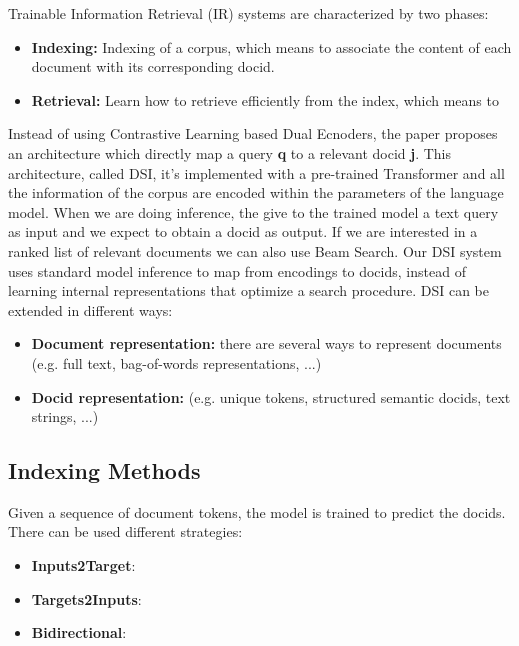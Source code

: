 Trainable Information Retrieval (IR) systems are characterized by two phases:
\begin{itemize}
  \item \textbf{Indexing: }Indexing of a corpus, which means to associate the content of each document with its corresponding docid.
  \item \textbf{Retrieval: }Learn how to retrieve efficiently from the index, which means to 
\end{itemize}
Instead of using Contrastive Learning based Dual Ecnoders, the paper proposes an architecture which directly map a query \textbf{q} to a relevant docid \textbf{j}. This architecture, called DSI, it's implemented with a pre-trained Transformer and all the information of the corpus are encoded within the parameters of the language model. When we are doing inference, the give to the trained model a text query as input and we expect to obtain a docid as output. If we are interested in a ranked list of relevant documents we can also use Beam Search. Our DSI system uses standard model inference to map from encodings to docids, instead of learning internal representations that optimize a search procedure. DSI can be extended in different ways:
\begin{itemize}
  \item \textbf{Document representation: }there are several ways to represent documents (e.g. full text, bag-of-words representations, ...)
  \item \textbf{Docid representation: }(e.g. unique tokens, structured semantic docids, text strings, ...)
\end{itemize}

\subsection{Indexing Methods}
Given a sequence of document tokens, the model is trained to predict the docids. There can be used different strategies:
\begin{itemize}
  \item \textbf{Inputs2Target}: 
  \item \textbf{Targets2Inputs}:
  \item \textbf{Bidirectional}: 
\end{itemize}